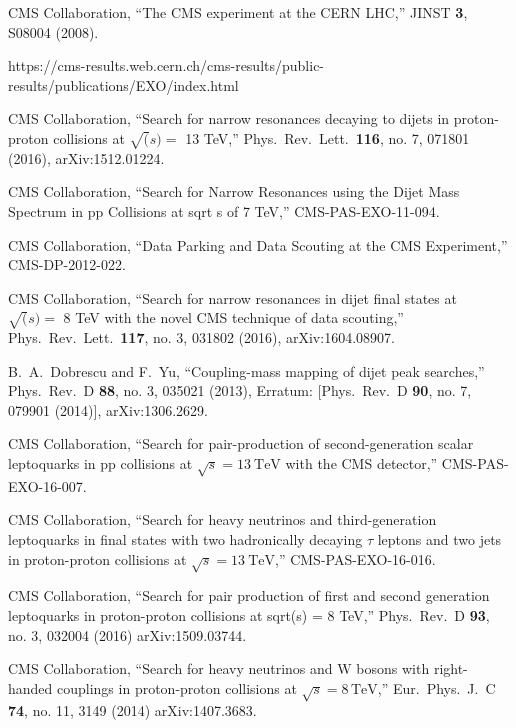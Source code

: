 \documentclass[epj]{webofc}
\begin{document}
\begin{thebibliography}{}
%
%


  CMS Collaboration,
  ``The CMS experiment at the CERN LHC,''
  JINST {\bf 3}, S08004 (2008).

https://cms-results.web.cern.ch/cms-results/public-results/publications/EXO/index.html

  CMS Collaboration,
  ``Search for narrow resonances decaying to dijets in proton-proton collisions at $\sqrt(s) =$ 13 TeV,''
  Phys.\ Rev.\ Lett.\  {\bf 116}, no. 7, 071801 (2016),
  arXiv:1512.01224.

  CMS Collaboration,
  ``Search for Narrow Resonances using the Dijet Mass Spectrum in pp Collisions at sqrt s of 7 TeV,''
  CMS-PAS-EXO-11-094.

  CMS Collaboration,
  ``Data Parking and Data Scouting at the CMS Experiment,''
  CMS-DP-2012-022.

  CMS Collaboration,
  ``Search for narrow resonances in dijet final states at $\sqrt(s)=$ 8 TeV with the novel CMS technique of data scouting,''
  Phys.\ Rev.\ Lett.\  {\bf 117}, no. 3, 031802 (2016), 
  arXiv:1604.08907.

  B.~A.~Dobrescu and F.~Yu,
  ``Coupling-mass mapping of dijet peak searches,''
  Phys.\ Rev.\ D {\bf 88}, no. 3, 035021 (2013), 
  Erratum: [Phys.\ Rev.\ D {\bf 90}, no. 7, 079901 (2014)], 
  arXiv:1306.2629.

  CMS Collaboration,
  ``Search for pair-production of second-generation scalar leptoquarks
  in pp collisions at $\sqrt{s}=13~\mathrm{TeV}$ with the CMS
  detector,'' CMS-PAS-EXO-16-007.

  CMS Collaboration,
  ``Search for heavy neutrinos and third-generation leptoquarks in final states with two hadronically decaying $\tau$ leptons and two jets in proton-proton collisions at $\sqrt{s} = 13~\mathrm{TeV}$,''
  CMS-PAS-EXO-16-016.

  CMS Collaboration,
  ``Search for pair production of first and second generation leptoquarks in proton-proton collisions at sqrt(s) = 8 TeV,''
  Phys.\ Rev.\ D {\bf 93}, no. 3, 032004 (2016)
  arXiv:1509.03744.

  CMS Collaboration,
  ``Search for heavy neutrinos and $\mathrm {W}$ bosons with right-handed couplings in proton-proton collisions at $\sqrt{s} = 8\,\text {TeV} $,''
  Eur.\ Phys.\ J.\ C {\bf 74}, no. 11, 3149 (2014)
  arXiv:1407.3683.

\end{thebibliography}
\end{document}
